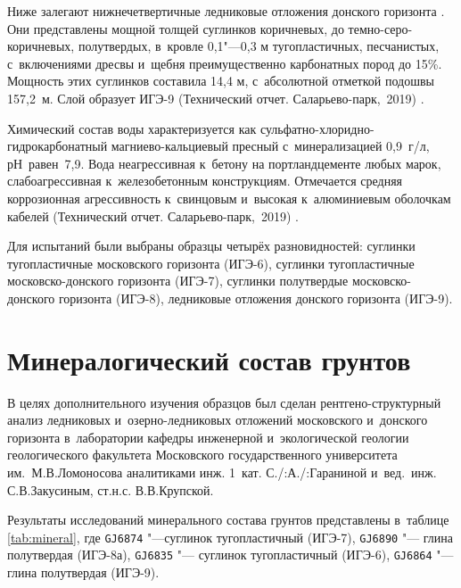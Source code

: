Ниже залегают нижнечетвертичные ледниковые отложения донского горизонта . 
Они представлены мощной толщей суглинков коричневых, до темно-серо-коричневых, полутвердых, в~кровле 0,1"---0,3 м тугопластичных, песчанистых, с~включениями дресвы и~щебня преимущественно карбонатных пород до 15\%. 
Мощность этих суглинков составила 14,4 м, с~абсолютной отметкой подошвы 157,2~м. 
Слой образует ИГЭ-9 (Технический отчет. Саларьево-парк,~2019) \cite{moshkin2019}.

Химический состав воды характеризуется как сульфатно-хлоридно-гидрокарбонатный магниево-кальциевый пресный с~минерализацией 0,9~г/л, рН~равен~7,9. 
Вода неагрессивная к~бетону на портландцементе любых марок, слабоагрессивная к~железобетонным конструкциям. 
Отмечается средняя коррозионная агрессивность к~свинцовым и~высокая к~алюминиевым оболочкам кабелей (Технический отчет. Саларьево-парк,~2019) \cite{moshkin2019}.


Для испытаний были выбраны образцы четырёх разновидностей: 
суглинки тугопластичные московского горизонта (ИГЭ-6), 
суглинки тугопластичные московско-донского горизонта (ИГЭ-7), 
суглинки полутвердые московско-донского горизонта (ИГЭ-8), 
ледниковые отложения донского горизонта (ИГЭ-9). 




 \section{Минералогический состав грунтов} 

В целях дополнительного изучения образцов был сделан рентгено-структурный анализ 
ледниковых и~озерно-ледниковых отложений московского и~донского горизонта 
в~лаборатории кафедры инженерной и~экологической геологии 
геологического факультета Московского государственного университета им.~М.\:В.\:Ломоносова 
аналитиками инж. 1~кат. С./:А./:Гараниной и~вед.~инж. С.\:В.\:Закусиным, ст.\:н.\:с. В.\:В.\:Крупской.


Результаты исследований минерального состава грунтов представлены в~таблице \ref{tab:mineral}, 
где \texttt{GJ6874} "---суглинок тугопластичный (ИГЭ-7), 
\texttt{GJ6890} "--- глина полутвердая (ИГЭ-8а), 
\texttt{GJ6835} "--- суглинок тугопластичный (ИГЭ-6), 
\texttt{GJ6864} "--- глина полутвердая (ИГЭ-9).


